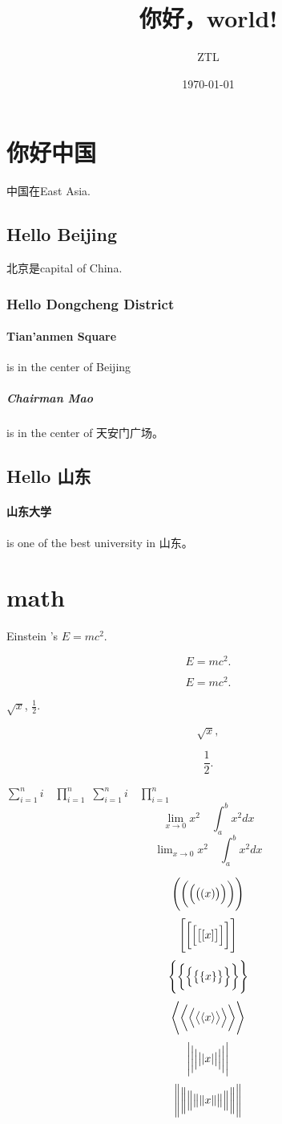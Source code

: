 \documentclass[UTF8]{ctexart}
\title{你好，world!}
\author{ZTL}
\date{\today}
\begin{document}
\maketitle
\tableofcontents
\newpage



\section{你好中国}
中国在East Asia.
\subsection{Hello Beijing}
北京是capital of China.
\subsubsection{Hello Dongcheng District}
\paragraph{Tian'anmen Square}
is in the center of Beijing
\subparagraph{Chairman Mao}
is in the center of 天安门广场。
\subsection{Hello 山东}
\paragraph{山东大学} is one of the best university in 山东。

\section{math}
Einstein 's $E=mc^2$.

\[ E=mc^2. \]

\begin{equation}
E=mc^2.
\end{equation}

$\sqrt{x}$, $\frac{1}{2}$.

\[ \sqrt{x}, \]

\[ \frac{1}{2}. \]

$ \sum_{i=1}^n i\quad \prod_{i=1}^n $
$ \sum\limits _{i=1}^n i\quad \prod\limits _{i=1}^n $
\[ \lim_{x\to0}x^2 \quad \int_a^b x^2 dx \]
\[ \lim\nolimits _{x\to0}x^2\quad \int\nolimits_a^b x^2 dx \]

\[ \Biggl(\biggl(\Bigl(\bigl((x)\bigr)\Bigr)\biggr)\Biggr) \]
\[ \Biggl[\biggl[\Bigl[\bigl[[x]\bigr]\Bigr]\biggr]\Biggr] \]
\[ \Biggl \{\biggl \{\Bigl \{\bigl \{\{x\}\bigr \}\Bigr \}\biggr \}\Biggr\} \]
\[ \Biggl\langle\biggl\langle\Bigl\langle\bigl\langle\langle x
\rangle\bigr\rangle\Bigr\rangle\biggr\rangle\Biggr\rangle \]
\[ \Biggl\lvert\biggl\lvert\Bigl\lvert\bigl\lvert\lvert x
\rvert\bigr\rvert\Bigr\rvert\biggr\rvert\Biggr\rvert \]
\[ \Biggl\lVert\biggl\lVert\Bigl\lVert\bigl\lVert\lVert x
\rVert\bigr\rVert\Bigr\rVert\biggr\rVert\Biggr\rVert \]
\end{document}
